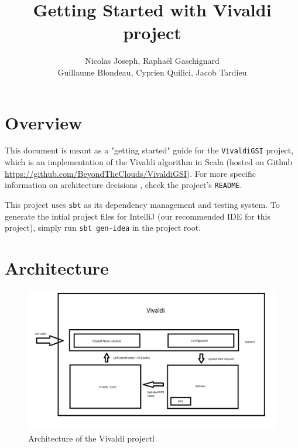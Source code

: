 \documentclass[11pt,a4paper]{article}
\title{Getting Started with Vivaldi project}
\author{Nicolas Joseph, Raphaël Gaschignard\\ Guillaume Blondeau, Cyprien Quilici, Jacob Tardieu}
\begin{document}
\maketitle

\section{Overview}
  This document is meant as a "getting started" guide for the \texttt{VivaldiGSI} project, which is an implementation of the Vivaldi algorithm in Scala (hosted on Github \href{https://github.com/BeyondTheClouds/VivaldiGSI}{https://github.com/BeyondTheClouds/VivaldiGSI}). For more specific information on architecture decisions , check the project's \verb|README|.
  
    This project uses \verb|sbt| as its dependency management and testing system. To generate the intial project files for IntelliJ (our recommended IDE for this project), simply run \verb|sbt gen-idea| in the project root.
    
\section{Architecture}

\begin{figure}[h]
   \includegraphics[scale=0.4]{VivaldiArchitecture}
   \caption{\label{acteur} Architecture of the Vivaldi projectl}
\end{figure}
\end{document}
